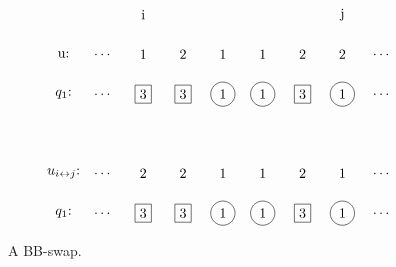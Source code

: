 \documentclass[submission]{FPSAC2018}
\newcommand{\0}{\phantom{c}}
\theoremstyle{plain}
\theoremstyle{definition}
\numberwithin{equation}{section}
\begin{document}
\begin{figure}
\[
\begin{tikzpicture}
  \node at (0,6){i};
  \node at (5,6){j};
  \node at(-2,5){u:};
  \node at(-2,4){$q_1$:};
  \node at(-1,5){$\dots$};
  \node at(-1,4){$\dots$};
  \node at (6,5){$\dots$};
  \node at (6,4){$\dots$};
  \node at (0,5){1};
  \node at (1,5){2};
  \node at (2,5){1};
  \node at (3,5){1};
  \node at (4,5){2};
  \node at (5,5){2};
  \node[rectangle,draw=black] at (0, 4){3};
  \node[rectangle,draw=black] at (1, 4){3};
  \node[circle,draw=black]    at (2, 4){1};
  \node[circle,draw=black]    at (3, 4){1};
  \node[rectangle,draw=black] at (4, 4){3};
  \node[circle,draw=black]    at (5, 4){1};

  \node at(-2,2){$u_{i\leftrightarrow j}$:};
  \node at(-2,1){$q_1$:};
  \node at(-1,2){$\dots$};
  \node at(-1,1){$\dots$};
  \node at (6,2){$\dots$};
  \node at (6,1){$\dots$};
  \node at (0,2){2};
  \node at (1,2){2};
  \node at (2,2){1};
  \node at (3,2){1};
  \node at (4,2){2};
  \node at (5,2){1};
  \node[rectangle,draw=black] at (0, 1){3};
  \node[rectangle,draw=black] at (1, 1){3};
  \node[circle,draw=black]    at (2, 1){1};
  \node[circle,draw=black]    at (3, 1){1};
  \node[rectangle,draw=black] at (4, 1){3};
  \node[circle,draw=black]    at (5, 1){1};
\end{tikzpicture}
\]
\caption{A BB-swap.}
\end{figure}
\end{document}
